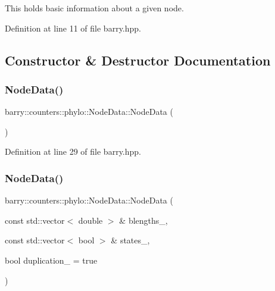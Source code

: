 This holds basic information about a given node. 

Definition at line 11 of file barry.\+hpp.



\subsection{Constructor \& Destructor Documentation}
\mbox{\label{classbarry_1_1counters_1_1phylo_1_1_node_data_ab6c4e49f9964d587e4fba24f9bb41b30}} 
\subsubsection{\texorpdfstring{Node\+Data()}{NodeData()}\hspace{0.1cm}{\footnotesize\ttfamily [1/2]}}
{\footnotesize\ttfamily barry\+::counters\+::phylo\+::\+Node\+Data\+::\+Node\+Data (\begin{DoxyParamCaption}{ }\end{DoxyParamCaption})\hspace{0.3cm}{\ttfamily [inline]}}



Definition at line 29 of file barry.\+hpp.

\mbox{\label{classbarry_1_1counters_1_1phylo_1_1_node_data_a0559756b8139d402af5046755992d83a}} 
\subsubsection{\texorpdfstring{Node\+Data()}{NodeData()}\hspace{0.1cm}{\footnotesize\ttfamily [2/2]}}
{\footnotesize\ttfamily barry\+::counters\+::phylo\+::\+Node\+Data\+::\+Node\+Data (\begin{DoxyParamCaption}\item[{const std\+::vector$<$ double $>$ \&}]{blengths\+\_\+,  }\item[{const std\+::vector$<$ bool $>$ \&}]{states\+\_\+,  }\item[{bool}]{duplication\+\_\+ = {\ttfamily true} }\end{DoxyParamCaption})\hspace{0.3cm}{\ttfamily [inline]}}



